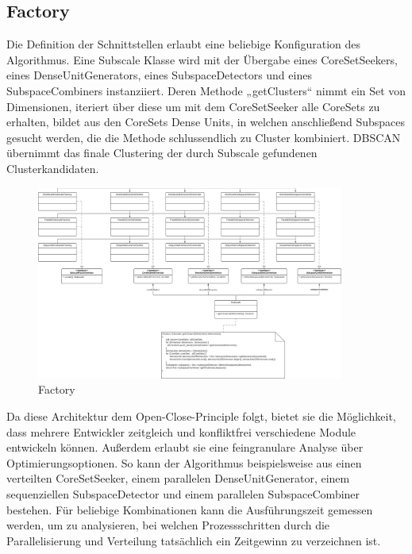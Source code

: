\subsection{Factory}
Die Definition der Schnittstellen erlaubt eine beliebige Konfiguration des Algorithmus. Eine Subscale Klasse wird mit der Übergabe eines CoreSetSeekers, eines DenseUnitGenerators, eines SubspaceDetectors und eines SubspaceCombiners instanziiert. Deren Methode „getClusters“ nimmt ein Set von Dimensionen, iteriert über diese um mit dem CoreSetSeeker alle CoreSets zu erhalten, bildet aus den CoreSets Dense Units, in welchen anschließend Subspaces gesucht werden, die die Methode schlussendlich zu Cluster kombiniert. DBSCAN übernimmt das finale Clustering der durch Subscale gefundenen Clusterkandidaten.
\begin{figure}[h]
	\centering
	\includegraphics[width=0.9\textwidth]{./Bilder/Restrukturierung/Factory.png}
	\caption{Factory}
\end{figure}
Da diese Architektur dem Open-Close-Principle folgt, bietet sie die Möglichkeit, dass mehrere Entwickler zeitgleich und konfliktfrei verschiedene Module entwickeln können. Außerdem erlaubt sie eine feingranulare Analyse über Optimierungsoptionen. So kann der Algorithmus beispielsweise aus einen verteilten CoreSetSeeker, einem parallelen DenseUnitGenerator, einem sequenziellen SubspaceDetector und einem parallelen SubspaceCombiner bestehen. Für beliebige Kombinationen kann die Ausführungszeit gemessen werden, um zu analysieren, bei welchen Prozessschritten durch die Parallelisierung und Verteilung tatsächlich ein Zeitgewinn zu verzeichnen ist.

